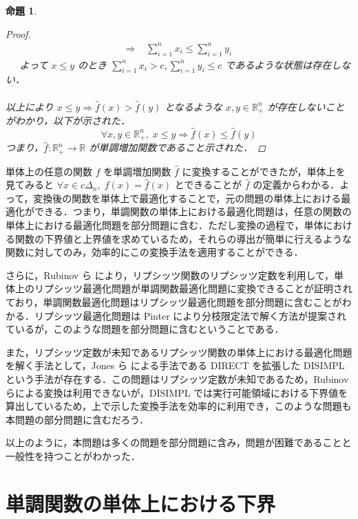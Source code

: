 \documentclass[a4paper,11pt]{jreport}
\newtheorem{proposition}{命題}
\begin{document}
\begin{proposition}
\begin{proof}
\begin{align*}
\Rightarrow & \; \sum_{i = 1}^{n} x_i \leq \sum_{i = 1}^{n} y_i
\end{align*}
$ \;\;\;\; $ よって $ x \leq y $ のとき $ \sum_{i = 1}^{n} x_i > c, \sum_{i = 1}^{n} y_i \leq c $ であるような状態は存在しない．\\
\\
以上により $ x \leq y \Rightarrow \hat{f}(x) > \hat{f}(y) $ となるような $ x, y \in \mathbb{R}_+^n $ が存在しないことがわかり，以下が示された．
$$ \forall x, y \in \mathbb{R}_+^n, \; x \leq y \Rightarrow \hat{f}(x) \leq \hat{f}(y) $$
つまり，$ \hat{f} : \mathbb{R}_+^n \to \mathbb{R} $ が単調増加関数であること示された．
\end{proof}
\end{proposition}

単体上の任意の関数 $ f $ を単調増加関数 $ \hat{f} $ に変換することができたが，単体上を見てみると $ \forall x \in c \Delta_n, \; f(x) = \hat{f}(x) $ とできることが $ \hat{f} $ の定義からわかる．よって，変換後の関数を単体上で最適化することで，元の問題の単体上における最適化ができる．つまり，単調関数の単体上における最適化問題は，任意の関数の単体上における最適化問題を部分問題に含む．ただし変換の過程で，単体における関数の下界値と上界値を求めているため，それらの導出が簡単に行えるような関数に対してのみ，効率的にこの変換手法を適用することができる．\par
さらに，Rubinov ら \cite{rubinov} により，リプシッツ関数のリプシッツ定数を利用して，単体上のリプシッツ最適化問題が単調関数最適化問題に変換できることが証明されており，単調関数最適化問題はリプシッツ最適化問題を部分問題に含むことがわかる．リプシッツ最適化問題は Pinter \cite{pinter} により分枝限定法で解く方法が提案されているが，このような問題を部分問題に含むということである．\par
また，リプシッツ定数が未知であるリプシッツ関数の単体上における最適化問題を解く手法として，Jones ら \cite{direct} による手法である DIRECT を拡張した DISIMPL \cite{disimpl} という手法が存在する．この問題はリプシッツ定数が未知であるため，Rubinov らによる変換は利用できないが，DISIMPL では実行可能領域における下界値を算出しているため，上で示した変換手法を効率的に利用でき，このような問題も本問題の部分問題に含むだろう．\par
以上のように，本問題は多くの問題を部分問題に含み，問題が困難であることと一般性を持つことがわかった．

\section{単調関数の単体上における下界} \label{sec:lower_bound_of_monotonic_function_on_simplex}
\end{document}
